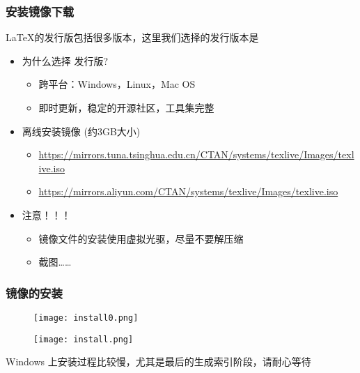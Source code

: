 
\begin{frame}[fragile]
  \frametitle{安装镜像下载}
  \LaTeX{}的发行版包括很多版本，这里我们选择的发行版本是 \TL 
  \begin{itemize}
    \item 为什么选择 \TL 发行版?
      \begin{itemize}
        \item 跨平台：Windows，Linux，Mac OS
        \item 即时更新，稳定的开源社区，工具集完整
      \end{itemize}
    \item 离线安装镜像 (约3GB大小)
      \begin{itemize}
        \item {\footnotesize
          \url{https://mirrors.tuna.tsinghua.edu.cn/CTAN/systems/texlive/Images/texlive.iso}}
        \item {\footnotesize
          \url{https://mirrors.aliyun.com/CTAN/systems/texlive/Images/texlive.iso}}
      \end{itemize}
    \item 注意！！！ 
      \begin{itemize}
         \item 镜像文件的安装使用虚拟光驱，尽量不要解压缩
         \item 截图……
      \end{itemize}
  \end{itemize}   
\end{frame}


\begin{frame}[fragile]
\frametitle{镜像的安装}
  \begin{figure}[h]
    \centering
    \texttt{[image: install0.png]}
  \end{figure}
\end{frame}

\begin{frame}[fragile]
  \begin{figure}[h]
    \centering
    \texttt{[image: install.png]}
  \end{figure}
   \centering Windows 上安装过程比较慢，尤其是最后的生成索引阶段，请耐心等待
\end{frame}


